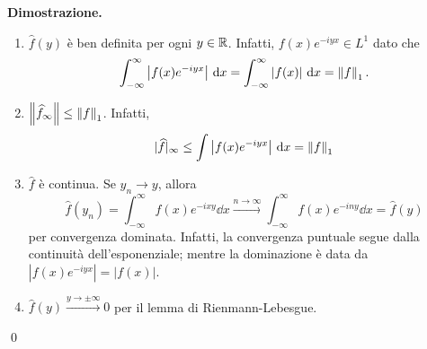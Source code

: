 \textbf{Dimostrazione.} 
\begin{enumerate}

	\item $\hat{f}(y)$ è ben definita per ogni $y \in \mathbb R$. Infatti, $f(x) e^{-iyx} \in L^1$ dato che
	$$
		\int_{-\infty}^\infty \left| f(x) e^{-iyx} \right| \,\mathrm{d} x 
		= \int_{-\infty}^\infty \left| f(x) \right| \,\mathrm{d} x
		= \left\lVert f \right\rVert_1.
	$$


	\item $\left\lVert \widehat{f}_\infty \right\rVert \leq \left\lVert f \right\rVert_1$. Infatti,
	$$
		|\widehat{f}|_\infty \leq \int \left| f(x) e^{-iyx} \right| \,\mathrm{d} x = \left\lVert f \right\rVert_1
	$$


	\item $\hat{f}$ è continua. Se $y_n \to y$, allora
	$$
		\hat{f}(y_n) = \int_{-\infty}^\infty f(x) e^{-ixy} \dd x \xrightarrow{n \to \infty}
		\int_{-\infty}^\infty f(x) e^{-iny} \dd x = \hat{f}(y)
	$$
	per convergenza dominata. Infatti, la convergenza puntuale segue dalla continuità dell'esponenziale; mentre la dominazione è data da $|f(x) e^{-iyx}| = |f(x)|$.


	\item $\hat{f}(y) \xrightarrow{y \to \pm \infty} 0$ per il lemma di Rienmann-Lebesgue.

\end{enumerate}
\qed

